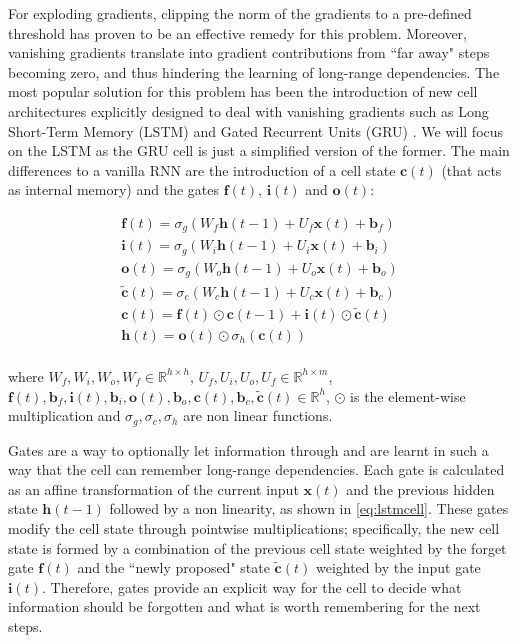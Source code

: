 For exploding gradients, clipping the norm of the gradients to a pre-defined threshold has proven to be an effective remedy for this problem. Moreover, vanishing gradients translate into gradient contributions from ``far away" steps becoming zero, and thus hindering the learning of long-range dependencies. The most popular solution for this problem has been the introduction of new cell architectures explicitly designed to deal with vanishing gradients such as Long Short-Term Memory (LSTM) \cite{hochreiter1997long} and Gated Recurrent Units (GRU) \cite{cho2014learning}. We will focus on the LSTM as the GRU cell is just a simplified version of the former. The main differences to a vanilla RNN are the introduction of a cell state $\mathbf{c}(t)$ (that acts as internal memory) and the gates $\mathbf{f}(t)$, $\mathbf{i}(t)$ and $\mathbf{o}(t)$: 

\begin{equation} \label{eq:lstmcell}
	\begin{gathered}
		\mathbf{f}(t) = \sigma_g(W_f \mathbf{h}(t-1) + U_f\mathbf{x}(t) + \mathbf{b}_f) \\
		\mathbf{i}(t) = \sigma_g(W_i \mathbf{h}(t-1) + U_i \mathbf{x}(t) + \mathbf{b}_i) \\
		\mathbf{o}(t) = \sigma_g(W_o \mathbf{h}(t-1) + U_o \mathbf{x}(t) + \mathbf{b}_o) \\
		\mathbf{\tilde{c}}(t) = \sigma_c(W_c \mathbf{h}(t-1) + U_c \mathbf{x}(t) + \mathbf{b}_c) \\
		\mathbf{c}(t) = \mathbf{f}(t) \odot \mathbf{c}(t-1) + \mathbf{i}(t) \odot \mathbf{\tilde{c}}(t) \\
		\mathbf{h}(t) = \mathbf{o}(t) \odot \sigma_h(\mathbf{c}(t))\\
	\end{gathered}
\end{equation}

where $W_f,W_i,W_o,W_f \in \mathbb{R}^{h \times h}$, $U_f,U_i,U_o,U_f \in \mathbb{R}^{h \times m}$, $\mathbf{f}(t),\mathbf{b}_f,\mathbf{i}(t),\mathbf{b}_i,  \allowbreak \mathbf{o}(t),\mathbf{b}_o,\mathbf{c}(t),\mathbf{b}_c,\mathbf{\tilde{c}}(t) \in \mathbb{R}^{h}$, $\odot$ is the element-wise multiplication and $\sigma_g,\sigma_c,\sigma_h$ are non linear functions. 

Gates are a way to optionally let information through and are learnt in such a way that the cell can remember long-range dependencies. Each gate is calculated as an affine transformation of the current input $\mathbf{x}(t)$ and the previous hidden state $\mathbf{h}(t-1)$ followed by a non linearity, as shown in \autoref{eq:lstmcell}. These gates modify the cell state through pointwise multiplications; specifically, the new cell state is formed by a combination of the previous cell state weighted by the forget gate $\mathbf{f}(t)$ and the ``newly proposed" state $\mathbf{\tilde{c}}(t)$ weighted by the input gate $\mathbf{i}(t)$. Therefore, gates provide an explicit way for the cell to decide what information should be forgotten and what is worth remembering for the next steps.  


